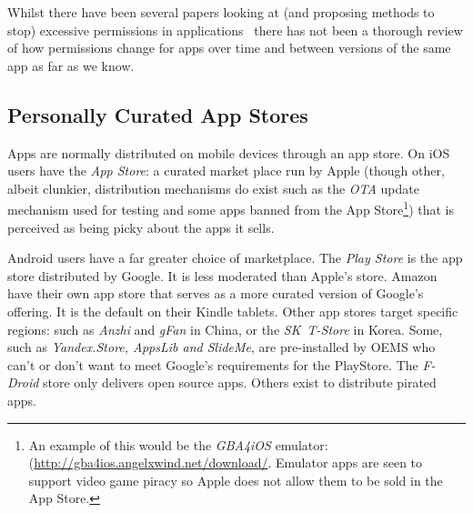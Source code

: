 \documentclass[a4paper]{article}
\begin{document}
Whilst there have been several papers looking at (and proposing methods to stop)
excessive permissions in applications~\cite{Felt:2011kj,Vidas:2011wr} there
has not been a thorough review of how permissions change for apps over time
and between versions of the same app as far as we know. 



\subsection{Personally Curated App Stores}

Apps are normally distributed on mobile devices through an app
store.  On iOS users have the \emph{App Store}: a curated market place run by
Apple (though other, albeit clunkier, distribution mechanisms do exist such as
the \emph{\ac{OTA}} update mechanism used for testing and some apps banned from
the App Store\footnote{An example of this would be the \emph{GBA4iOS} emulator:
(\url{http://gba4ios.angelxwind.net/download/}.  Emulator apps are seen to
support video game piracy so Apple does not allow them to be sold in the App
Store.}) that is perceived as being picky about the apps it sells.

Android users have a far greater choice of marketplace.  The \emph{Play Store}
is the app store distributed by Google. It is less moderated than Apple's store.
Amazon have their own app store that serves as a more curated version of
Google's offering. It is the default on their Kindle tablets.  Other app stores
target specific regions: such as \emph{Anzhi} and \emph{gFan} in China, or the \emph{SK~T-Store}
in Korea.  Some, such as \emph{Yandex.Store, AppsLib and SlideMe}, are
pre-installed by OEMS who can't or don't want to meet Google's requirements for
the PlayStore.  The \emph{F-Droid} store only delivers open source apps. Others
exist to distribute pirated apps. 
\end{document}
